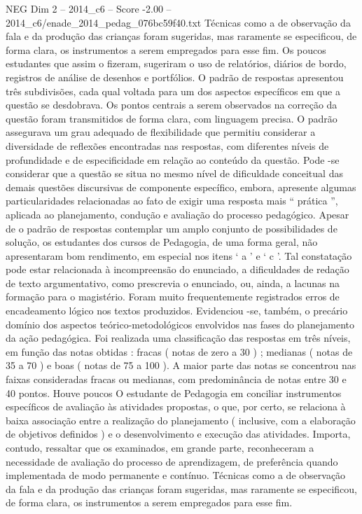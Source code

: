 \begin{textsample}{NEG Dim 2 – 2014\_c6 – Score -2.00 – 2014\_c6/enade\_2014\_pedag\_076bc59f40.txt}
Técnicas como a de observação da fala e da produção das crianças foram sugeridas, mas raramente se especificou, de forma clara, os instrumentos a serem empregados para esse fim.
Os poucos estudantes que assim o fizeram, sugeriram o uso de relatórios, diários de bordo, registros de análise de desenhos e portfólios.
O padrão de respostas apresentou três subdivisões, cada qual voltada para um dos aspectos específicos em que a questão se desdobrava.
Os pontos centrais a serem observados na correção da questão foram transmitidos de forma clara, com linguagem precisa.
O padrão assegurava um grau adequado de flexibilidade que permitiu considerar a diversidade de reflexões encontradas nas respostas, com diferentes níveis de profundidade e de especificidade em relação ao conteúdo da questão.
Pode -se considerar que a questão se situa no mesmo nível de dificuldade conceitual das demais questões discursivas de componente específico, embora, apresente algumas particularidades relacionadas ao fato de exigir uma resposta mais “ prática ”, aplicada ao planejamento, condução e avaliação do processo pedagógico.
Apesar de o padrão de respostas contemplar um amplo conjunto de possibilidades de solução, os estudantes dos cursos de Pedagogia, de uma forma geral, não apresentaram bom rendimento, em especial nos itens ‘ a ’ e ‘ c ’.
Tal constatação pode estar relacionada à incompreensão do enunciado, a dificuldades de redação de texto argumentativo, como prescrevia o enunciado, ou, ainda, a lacunas na formação para o magistério.
Foram muito frequentemente registrados erros de encadeamento lógico nos textos produzidos.
Evidenciou -se, também, o precário domínio dos aspectos teórico-metodológicos envolvidos nas fases do planejamento da ação pedagógica.
Foi realizada uma classificação das respostas em três níveis, em função das notas obtidas : fracas ( notas de zero a 30 ) ; medianas ( notas de 35 a 70 ) e boas ( notas de 75 a 100 ).
A maior parte das notas se concentrou nas faixas consideradas fracas ou medianas, com predominância de notas entre 30 e 40 pontos.
Houve poucos O estudante de Pedagogia em conciliar instrumentos específicos de avaliação às atividades propostas, o que, por certo, se relaciona à baixa associação entre a realização do planejamento ( inclusive, com a elaboração de objetivos definidos ) e o desenvolvimento e execução das atividades.
Importa, contudo, ressaltar que os examinados, em grande parte, reconheceram a necessidade de avaliação do processo de aprendizagem, de preferência quando implementada de modo permanente e contínuo.
Técnicas como a de observação da fala e da produção das crianças foram sugeridas, mas raramente se especificou, de forma clara, os instrumentos a serem empregados para esse fim.

\end{textsample}
